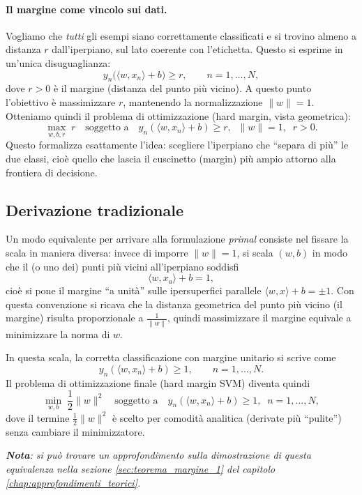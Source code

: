 \paragraph{Il margine come vincolo sui dati.}
Vogliamo che \emph{tutti} gli esempi siano correttamente classificati e si trovino almeno a distanza $r$ dall’iperpiano, sul lato coerente con l’etichetta. Questo si esprime in un’unica disuguaglianza:
\[
y_n\big(\langle w,x_n\rangle + b\big) \ge r,
\qquad n=1,\dots,N,
\]
dove $r>0$ è il margine (distanza del punto più vicino). A questo punto l’obiettivo è massimizzare $r$, mantenendo la normalizzazione $\|w\|=1$. Otteniamo quindi il problema di ottimizzazione (hard margin, vista geometrica):
\[
\max_{w,b,r}\; r
\quad
\text{soggetto a}\quad
y_n(\langle w,x_n\rangle + b)\ge r,\;\; \|w\|=1,\;\; r>0.
\]
Questo formalizza esattamente l’idea: scegliere l’iperpiano che “separa di più” le due classi, cioè quello che lascia il cuscinetto (margin) più ampio attorno alla frontiera di decisione.

\subsection{Derivazione tradizionale}\label{sec:svm_traditional_derivation}
Un modo equivalente per arrivare alla formulazione \emph{primal} consiste nel fissare la scala in maniera diversa: invece di imporre $\|w\|=1$, si scala $(w,b)$ in modo che il (o uno dei) punti più vicini all’iperpiano soddisfi
\[
\langle w, x_a\rangle + b = 1,
\]
cioè si pone il margine “a unità” sulle ipersuperfici parallele $\langle w,x\rangle+b=\pm 1$. Con questa convenzione si ricava che la distanza geometrica del punto più vicino (il margine) risulta proporzionale a $\tfrac{1}{\|w\|}$, quindi massimizzare il margine equivale a minimizzare la norma di $w$.

In questa scala, la corretta classificazione con margine unitario si scrive come
\[
y_n(\langle w,x_n\rangle + b)\ge 1,\qquad n=1,\dots,N.
\]
Il problema di ottimizzazione finale (hard margin SVM) diventa quindi
\[
\min_{w,b}\; \frac{1}{2}\|w\|^2
\quad
\text{soggetto a}\quad
y_n(\langle w,x_n\rangle + b)\ge 1,\;\; n=1,\dots,N,
\]
dove il termine $\tfrac12\|w\|^2$ è scelto per comodità analitica (derivate più “pulite”) senza cambiare il minimizzatore.

\medskip
\noindent
\textit{\textbf{Nota}: si può trovare un approfondimento sulla dimostrazione di questa equivalenza nella sezione \ref{sec:teorema_margine_1} del capitolo \ref{chap:approfondimenti_teorici}.}

